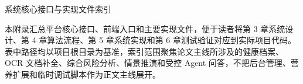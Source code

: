 \documentclass[UTF8, a4paper, 12pt, oneside]{ctexrep}
\numberwithin{equation}{chapter}
\begin{document}
{}
\begin{center}
{\heiti{} 系统核心接口与实现文件索引\par}
\end{center}
\vspace{0.5\baselineskip}

{
\songti{}
\onehalfspacing
\noindent 本附录汇总平台核心接口、前端入口和主要实现文件，便于读者将第 3 章系统设计、第 4 章算法流程、第 5 章系统实现和第 6 章测试验证对应到实际项目代码。表中路径均以项目根目录为基准，索引范围聚焦论文主线所涉及的健康档案、OCR 文档补全、综合风险分析、情景推演和受控 Agent 问答，不把后台管理、营养扩展和临时调试脚本作为正文主线展开。

}
\end{document}
